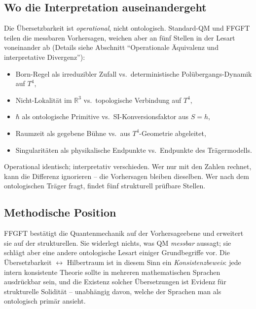 \subsection*{Wo die Interpretation auseinandergeht}

Die Übersetzbarkeit ist \emph{operational}, nicht ontologisch.
Standard-QM und FFGFT teilen die messbaren Vorhersagen, weichen aber
an fünf Stellen in der Lesart voneinander ab (Details siehe
Abschnitt \enquote{Operationale Äquivalenz und interpretative
Divergenz}):

\begin{itemize}[leftmargin=2em,itemsep=2pt,topsep=2pt]
  \item Born-Regel als irreduzibler Zufall vs.\ deterministische
        Polübergangs-Dynamik auf $T^4$,
  \item Nicht-Lokalität im $\mathbb{R}^3$ vs.\ topologische
        Verbindung auf $T^4$,
  \item $\hbar$ als ontologische Primitive vs.\ SI-Konversionsfaktor
        aus $S=h$,
  \item Raumzeit als gegebene Bühne vs.\ aus $T^4$-Geometrie
        abgeleitet,
  \item Singularitäten als physikalische Endpunkte vs.\ Endpunkte
        des Trägermodells.
\end{itemize}

Operational identisch; interpretativ verschieden. Wer nur mit den
Zahlen rechnet, kann die Differenz ignorieren -- die Vorhersagen
bleiben dieselben. Wer nach dem ontologischen Träger fragt, findet
fünf strukturell prüfbare Stellen.

\subsection*{Methodische Position}

FFGFT bestätigt die Quantenmechanik auf der Vorhersageebene und
erweitert sie auf der strukturellen. Sie widerlegt nichts, was QM
\emph{messbar} aussagt; sie schlägt aber eine andere ontologische
Lesart einiger Grundbegriffe vor. Die Übersetzbarkeit
$\leftrightarrow$ Hilbertraum ist in diesem Sinn ein
\emph{Konsistenzbeweis}: jede intern konsistente Theorie sollte in
mehreren mathematischen Sprachen ausdrückbar sein, und die Existenz
solcher Übersetzungen ist Evidenz für strukturelle Solidität --
unabhängig davon, welche der Sprachen man als ontologisch primär
ansieht.
